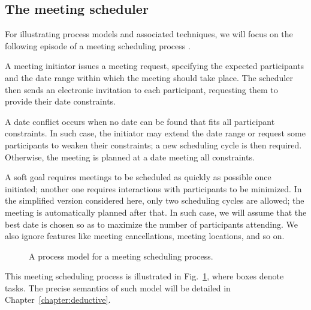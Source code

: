 \subsection{The meeting scheduler\label{subsection:background-meeting-scheduler}}

For illustrating process models and associated techniques, we will focus on the following episode of a meeting scheduling process \cite{Feather:1997}. 

A meeting initiator issues a meeting request, specifying the expected participants and the date range within which the meeting should take place. The scheduler then sends an electronic invitation to each participant, requesting them to provide their date constraints. 

A date conflict occurs when no date can be found that fits all participant constraints. In such case, the initiator may extend the date range or request some participants to weaken their constraints; a new scheduling cycle is then required. Otherwise, the meeting is planned at a date meeting all constraints.

A soft goal requires meetings to be scheduled as quickly as possible once initiated; another one requires interactions with participants to be minimized. In the simplified version considered here, only two scheduling cycles are allowed; the meeting is automatically planned after that. In such case, we will assume that the best date is chosen so as to maximize the number of participants attending. We also ignore features like meeting cancellations, meeting locations, and so on.

\begin{figure}[H]\centering
{}
\caption{A process model for a meeting scheduling process.\label{image:scheduler-ghmsc}}
\end{figure}

This meeting scheduling process is illustrated in Fig.~\ref{image:scheduler-ghmsc}, where boxes denote tasks. The precise semantics of such model will be detailed in Chapter~\ref{chapter:deductive}.

